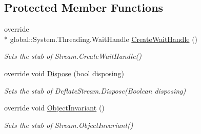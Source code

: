 \subsection*{Protected Member Functions}
\begin{DoxyCompactItemize}
\item 
override \\*
global\-::\-System.\-Threading.\-Wait\-Handle \hyperlink{class_system_1_1_i_o_1_1_compression_1_1_fakes_1_1_stub_deflate_stream_a78932863938fe7572435ab8c4d293767}{Create\-Wait\-Handle} ()
\begin{DoxyCompactList}\small\item\em Sets the stub of Stream.\-Create\-Wait\-Handle()\end{DoxyCompactList}\item 
override void \hyperlink{class_system_1_1_i_o_1_1_compression_1_1_fakes_1_1_stub_deflate_stream_ae8b8d03869648b74485ec1a5f9d613f8}{Dispose} (bool disposing)
\begin{DoxyCompactList}\small\item\em Sets the stub of Deflate\-Stream.\-Dispose(\-Boolean disposing)\end{DoxyCompactList}\item 
override void \hyperlink{class_system_1_1_i_o_1_1_compression_1_1_fakes_1_1_stub_deflate_stream_a78a2679d57dba24d53e0b90153c5fa37}{Object\-Invariant} ()
\begin{DoxyCompactList}\small\item\em Sets the stub of Stream.\-Object\-Invariant()\end{DoxyCompactList}\end{DoxyCompactItemize}
